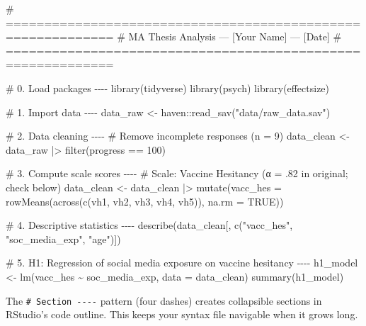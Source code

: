 \documentclass[
  11pt,
  a4paper,
]{scrbook}
\newenvironment{Shaded}{\begin{snugshade}}{\end{snugshade}}
\newcommand{\AttributeTok}[1]{\textcolor[rgb]{0.40,0.45,0.13}{#1}}
\newcommand{\CommentTok}[1]{\textcolor[rgb]{0.37,0.37,0.37}{#1}}
\newcommand{\ConstantTok}[1]{\textcolor[rgb]{0.56,0.35,0.01}{#1}}
\newcommand{\DecValTok}[1]{\textcolor[rgb]{0.68,0.00,0.00}{#1}}
\newcommand{\FunctionTok}[1]{\textcolor[rgb]{0.28,0.35,0.67}{#1}}
\newcommand{\NormalTok}[1]{\textcolor[rgb]{0.00,0.23,0.31}{#1}}
\newcommand{\OtherTok}[1]{\textcolor[rgb]{0.00,0.23,0.31}{#1}}
\newcommand{\SpecialCharTok}[1]{\textcolor[rgb]{0.37,0.37,0.37}{#1}}
\newcommand{\StringTok}[1]{\textcolor[rgb]{0.13,0.47,0.30}{#1}}
\begin{document}
\begin{Shaded}
\begin{Highlighting}[]
\CommentTok{\# ============================================================}
\CommentTok{\# MA Thesis Analysis — [Your Name] — [Date]}
\CommentTok{\# ============================================================}

\CommentTok{\# 0. Load packages {-}{-}{-}{-}}
\FunctionTok{library}\NormalTok{(tidyverse)}
\FunctionTok{library}\NormalTok{(psych)}
\FunctionTok{library}\NormalTok{(effectsize)}

\CommentTok{\# 1. Import data {-}{-}{-}{-}}
\NormalTok{data\_raw }\OtherTok{\textless{}{-}}\NormalTok{ haven}\SpecialCharTok{::}\FunctionTok{read\_sav}\NormalTok{(}\StringTok{"data/raw\_data.sav"}\NormalTok{)}

\CommentTok{\# 2. Data cleaning {-}{-}{-}{-}}
\CommentTok{\# Remove incomplete responses (n = 9)}
\NormalTok{data\_clean }\OtherTok{\textless{}{-}}\NormalTok{ data\_raw }\SpecialCharTok{|\textgreater{}}
  \FunctionTok{filter}\NormalTok{(progress }\SpecialCharTok{==} \DecValTok{100}\NormalTok{)}

\CommentTok{\# 3. Compute scale scores {-}{-}{-}{-}}
\CommentTok{\# Scale: Vaccine Hesitancy (α = .82 in original; check below)}
\NormalTok{data\_clean }\OtherTok{\textless{}{-}}\NormalTok{ data\_clean }\SpecialCharTok{|\textgreater{}}
  \FunctionTok{mutate}\NormalTok{(}\AttributeTok{vacc\_hes =} \FunctionTok{rowMeans}\NormalTok{(}\FunctionTok{across}\NormalTok{(}\FunctionTok{c}\NormalTok{(vh1, vh2, vh3, vh4, vh5)),}
                              \AttributeTok{na.rm =} \ConstantTok{TRUE}\NormalTok{))}

\CommentTok{\# 4. Descriptive statistics {-}{-}{-}{-}}
\FunctionTok{describe}\NormalTok{(data\_clean[, }\FunctionTok{c}\NormalTok{(}\StringTok{"vacc\_hes"}\NormalTok{, }\StringTok{"soc\_media\_exp"}\NormalTok{, }\StringTok{"age"}\NormalTok{)])}

\CommentTok{\# 5. H1: Regression of social media exposure on vaccine hesitancy {-}{-}{-}{-}}
\NormalTok{h1\_model }\OtherTok{\textless{}{-}} \FunctionTok{lm}\NormalTok{(vacc\_hes }\SpecialCharTok{\textasciitilde{}}\NormalTok{ soc\_media\_exp, }\AttributeTok{data =}\NormalTok{ data\_clean)}
\FunctionTok{summary}\NormalTok{(h1\_model)}
\end{Highlighting}
\end{Shaded}

\begin{tcolorbox}[enhanced jigsaw, bottomrule=.15mm, opacityback=0, toprule=.15mm, colframe=quarto-callout-tip-color-frame, left=2mm, rightrule=.15mm, title=\textcolor{quarto-callout-tip-color}{\faLightbulb}\hspace{0.5em}{Use section headers in your script}, colbacktitle=quarto-callout-tip-color!10!white, bottomtitle=1mm, colback=white, breakable, toptitle=1mm, titlerule=0mm, leftrule=.75mm, arc=.35mm, opacitybacktitle=0.6, coltitle=black]

The \texttt{\#\ Section\ -\/-\/-\/-} pattern (four dashes) creates
collapsible sections in RStudio's code outline. This keeps your syntax
file navigable when it grows long.

\end{tcolorbox}
\end{document}

